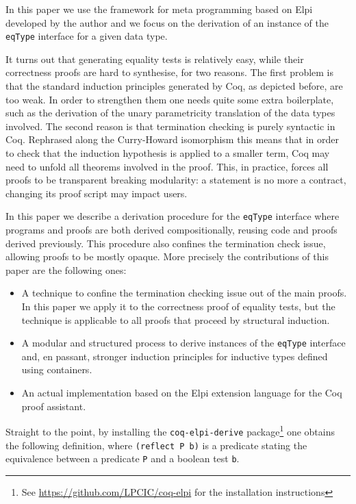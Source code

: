 \documentclass[sigplan,10pt,review]{acmart}\settopmatter{printfolios=true,printccs=false,printacmref=false}
\begin{document}
In this paper we use the framework for meta programming based on
Elpi~\cite{dunchev:hal-01176856,tassi:hal-01637063} developed by the
author and we focus on the derivation of an instance of the
\lstinline+eqType+ interface for a given data type.

It turns out that generating equality tests is relatively easy,
while their correctness proofs are hard to synthesise, for two reasons. 
The first problem is that 
the standard induction principles generated by Coq, as depicted
before, are too weak. In order to strengthen them one needs quite some extra
boilerplate, such as the derivation of the unary parametricity
translation of the data types involved.
The second reason is that termination checking
is purely syntactic in Coq. Rephrased along the Curry-Howard
isomorphism this means that in order to check that the induction
hypothesis is applied to a smaller term, Coq may need to unfold all
theorems involved in the proof. This, in practice, forces all proofs to
be transparent breaking modularity: a statement is no more a contract,
changing its proof script may impact users.

In this paper we describe a derivation procedure for the
\lstinline+eqType+ interface where programs and proofs are both
derived compositionally, reusing code and proofs derived previously.
This procedure also confines the termination check issue,
allowing proofs to be mostly opaque.
More precisely the contributions of this paper are the following ones:
\begin{itemize}
\item A technique to confine the termination checking issue out of the
	main proofs. In this paper we apply it to the correctness
	proof of equality
	tests, but the technique is applicable to all proofs 
	that proceed by structural
	induction.

\item A modular and structured process to derive instances of the
	\lstinline+eqType+ interface and, en passant, stronger
	induction principles for inductive types defined using
	containers.

\item An actual implementation based on the Elpi extension language
	for the Coq proof assistant.
\end{itemize}

\noindent
Straight to the point, by installing the \lstinline+coq-elpi-derive+
package\footnote{See \url{https://github.com/LPCIC/coq-elpi} for the
installation instructions} 
one obtains the following definition, where \lstinline+(reflect P b)+
is a predicate stating the equivalence between a predicate
\lstinline+P+ and a boolean test \lstinline+b+.
\end{document}
